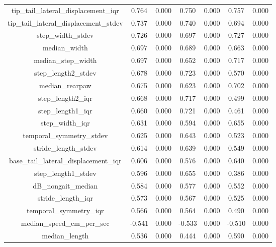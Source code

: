 \documentclass[11pt,reqno]{amsart}
\begin{document}
\begin{longtable}[c]{|c|c|c|c|c|c|c|}
tip\_tail\_lateral\_displacement\_iqr     & 0.764    & 0.000   & 0.750  & 0.000   & 0.757   & 0.000  \\
tip\_tail\_lateral\_displacement\_stdev   & 0.737    & 0.000   & 0.740  & 0.000   & 0.694   & 0.000  \\
step\_width\_stdev                        & 0.726    & 0.000   & 0.697  & 0.000   & 0.727   & 0.000  \\
median\_width                             & 0.697    & 0.000   & 0.689  & 0.000   & 0.663   & 0.000  \\
median\_step\_width                       & 0.697    & 0.000   & 0.652  & 0.000   & 0.717   & 0.000  \\
step\_length2\_stdev                      & 0.678    & 0.000   & 0.723  & 0.000   & 0.570   & 0.000  \\
median\_rearpaw                           & 0.675    & 0.000   & 0.623  & 0.000   & 0.702   & 0.000  \\
step\_length2\_iqr                        & 0.668    & 0.000   & 0.717  & 0.000   & 0.499   & 0.000  \\
step\_length1\_iqr                        & 0.660    & 0.000   & 0.721  & 0.000   & 0.461   & 0.000  \\
step\_width\_iqr                          & 0.631    & 0.000   & 0.594  & 0.000   & 0.655   & 0.000  \\
temporal\_symmetry\_stdev                 & 0.625    & 0.000   & 0.643  & 0.000   & 0.523   & 0.000  \\
stride\_length\_stdev                     & 0.614    & 0.000   & 0.639  & 0.000   & 0.549   & 0.000  \\
base\_tail\_lateral\_displacement\_iqr    & 0.606    & 0.000   & 0.576  & 0.000   & 0.640   & 0.000  \\
step\_length1\_stdev                      & 0.596    & 0.000   & 0.655  & 0.000   & 0.386   & 0.000  \\
dB\_nongait\_median                       & 0.584    & 0.000   & 0.577  & 0.000   & 0.552   & 0.000  \\
stride\_length\_iqr                       & 0.573    & 0.000   & 0.567  & 0.000   & 0.525   & 0.000  \\
temporal\_symmetry\_iqr                   & 0.566    & 0.000   & 0.564  & 0.000   & 0.490   & 0.000  \\
median\_speed\_cm\_per\_sec               & -0.541   & 0.000   & -0.533 & 0.000   & -0.510  & 0.000  \\
median\_length                            & 0.536    & 0.000   & 0.444  & 0.000   & 0.590   & 0.000  \\

\end{longtable}
\end{document}

